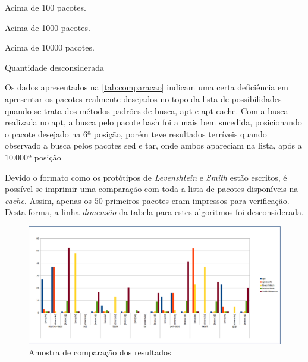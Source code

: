 \begin{table}[htbp]
\label{tab:comparacao}
\begin{description}
	\tiny
	\item [*] Acima de 100 pacotes.
	\item [**] Acima de 1000 pacotes.
	\item [***] Acima de 10000 pacotes.
	\item [$-$] Quantidade desconsiderada
\end{description}

\end{table}



Os dados apresentados na \autoref{tab:comparacao} indicam uma certa deficiência em apresentar os pacotes realmente desejados no topo da lista de possibilidades quando se trata dos métodos padrões de busca, {\code apt} e {\code apt-cache}. Com a busca realizada no {\code apt}, a busca pelo pacote {\code bash} foi a mais bem sucedida, posicionando o pacote desejado na $6ª$ posição, porém teve resultados terríveis quando observado a busca pelos pacotes {\code sed} e {\code tar}, onde ambos apareciam na lista, após a $10.000ª$ posição


Devido o formato como os protótipos de \textit{Levenshtein} e \textit{Smith} estão escritos, é possível se imprimir uma comparação com toda a lista de pacotes disponíveis na \textit{cache}. Assim, apenas os $50$ primeiros pacotes eram impressos para verificação. Desta forma, a linha \textit{dimensão} da tabela para estes algoritmos foi desconsiderada.

\begin{figure}[h]
  \centering
	\includegraphics[width=\textwidth,angle=0]{figuras/grafico}
  \caption{Amostra de comparação dos resultados}
  \label{fig:figuras_grafico}
\end{figure}


